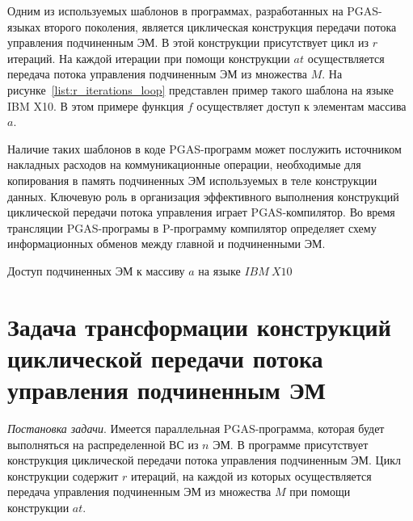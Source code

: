 
Одним из используемых шаблонов в программах, разработанных на PGAS-языках второго поколения, является циклическая конструкция передачи потока управления подчиненным ЭМ.
В этой конструкции присутствует цикл из $r$ итераций. На каждой итерации при помощи конструкции $at$ осуществляется передача потока управления подчиненным ЭМ из множества $M$. На рисунке~\ref{list:r_iterations_loop} представлен пример такого шаблона на языке IBM X10. В этом примере функция $f$ осуществляет доступ к элементам массива $a$.

Наличие таких шаблонов в коде PGAS-программ может послужить источником накладных расходов на коммуникационные операции, необходимые для копирования в память подчиненных ЭМ используемых в теле конструкции данных. Ключевую роль в организация эффективного выполнения конструкций циклической передачи потока управления играет PGAS-компилятор. Во время трансляции PGAS-програмы в P-программу компилятор определяет схему информационных обменов между главной и подчиненными ЭМ.

\begin{ListingEnv}[!htp]
	\small {}
    \caption{Доступ подчиненных ЭМ к массиву $a$ на языке $IBM\ X10$}
    \label{list:r_iterations_loop}
\end{ListingEnv}


\section{Задача трансформации конструкций циклической передачи потока управления подчиненным ЭМ}

\textit{Постановка задачи}. Имеется параллельная PGAS-программа, которая будет выполняться на распределенной ВС из $n$ ЭМ. В программе присутствует конструкция циклической передачи потока управления подчиненным ЭМ. Цикл конструкции содержит $r$ итераций, на каждой из которых осуществляется передача управления подчиненным ЭМ из множества $M$ при помощи конструкции $at$. 

